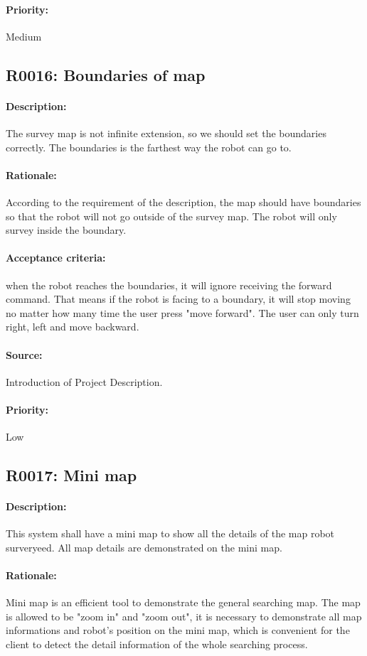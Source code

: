 \documentclass[11pt, a4paper]{report}
\begin{document}
\paragraph{Priority:}
Medium


\subsection{R0016: Boundaries of map}
\paragraph{Description:}
The survey map is not infinite extension, so we should set the boundaries correctly. The boundaries is the farthest way the robot can go to.
\paragraph{Rationale:}
According to the requirement of the description, the map should have boundaries so that the robot will not go outside of the survey map. The robot will only survey inside the boundary.
\paragraph{Acceptance criteria:}
when the robot reaches the boundaries, it will ignore receiving the forward command. That means if the robot is facing to a boundary, it will stop moving no matter how many time the user press "move forward". The user can only turn right, left and move backward.
\paragraph{Source:}
 Introduction of Project Description.
\paragraph{Priority:}
Low


\subsection{R0017: Mini map}
\paragraph{Description:}
This system shall have a mini map to show all the details of the map robot surveryeed. All map details are demonstrated on the mini map. 
\paragraph{Rationale:}
Mini map is an efficient tool to demonstrate the general searching map. The map is allowed to be "zoom in" and "zoom out", it is necessary to demonstrate all map informations and robot's position on the mini map, which is convenient for the client to detect the detail information of the whole searching process.    
\end{document}
